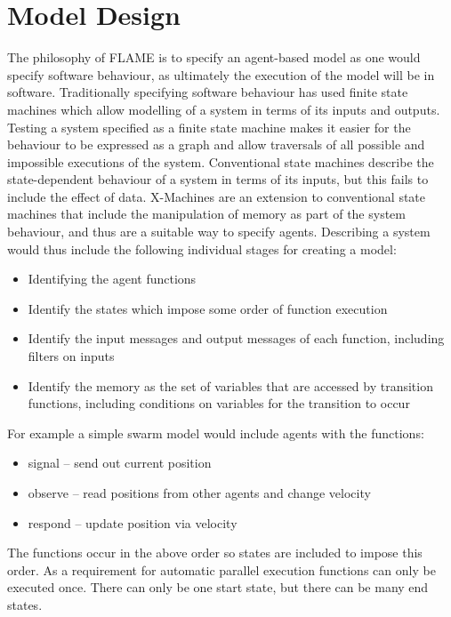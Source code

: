 \section{Model Design}
\label{model_design}

The philosophy of FLAME is to specify an agent-based model as one would
specify software behaviour, as ultimately the execution of the model will be in
software. Traditionally specifying software behaviour has used finite state
machines which allow modelling of a system in terms of its inputs and outputs.
Testing a system specified as a finite state machine makes it easier for the behaviour to be expressed as a graph
and allow traversals of all possible and impossible executions of the system.
Conventional state machines describe the state-dependent behaviour of a system 
in terms of its inputs, but this fails to include the effect of data.
X-Machines are an extension to conventional state machines that
include the manipulation of memory as part of the system behaviour,
and thus are a suitable way to specify agents.
Describing a system would thus include the following individual
stages for creating a model:

\begin{itemize}
\item Identifying the agent functions
\item Identify the states which impose some order of function execution
\item Identify the input messages and output messages of each function,
including filters on inputs
\item Identify the memory as the set of variables that are accessed by
transition functions, including conditions on variables for the transition to
occur
\end{itemize}

For example a simple swarm model would include agents with the functions:

\begin{itemize}
\item signal -- send out current position
\item observe -- read positions from other agents and change velocity
\item respond -- update position via velocity
\end{itemize}

The functions occur in the above order so states are included to impose this
order. As a requirement for automatic parallel execution functions can only be
executed once. There can only be one start state, but there can be many end
states.

